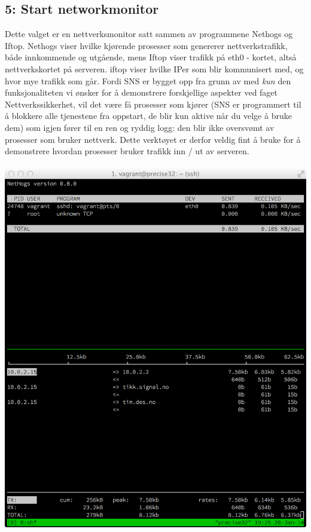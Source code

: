 \documentclass{article}
\begin{document}
\subsection{5: Start networkmonitor}
Dette valget er en nettverksmonitor satt sammen av programmene Nethogs og Iftop. Nethogs viser hvilke kjørende prosesser som genererer nettverkstrafikk, både innkommende og utgående, mens Iftop viser trafikk på eth0 - kortet, altså nettverkskortet på serveren. iftop viser hvilke IPer som blir kommunisert med, og hvor mye trafikk som går. Fordi SNS er bygget opp fra grunn av med \textit{kun} den funksjonaliteten vi ønsker for å demonstrere forskjellige aspekter ved faget Nettverkssikkerhet, vil det være få prosesser som kjører (SNS er programmert til å blokkere alle tjenestene fra oppstart, de blir kun aktive når du velge å bruke dem) som igjen fører til en ren og ryddig logg: den blir ikke oversvømt av prosesser som bruker nettverk. Dette verktøyet er derfor veldig fint å bruke for å demonstrere hvordan prosesser bruker trafikk inn / ut av serveren. 
\\ \\
\includegraphics[scale = 0.6]{pictures/networkmonitor.png} 
\end{document}
